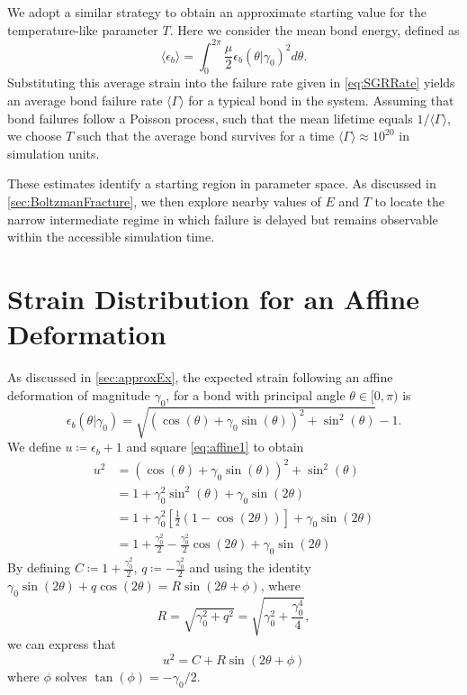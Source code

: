 \begin{subappendices}
We adopt a similar strategy to obtain an approximate starting value for the temperature-like parameter $T$. Here we consider the mean bond energy, defined as
\begin{equation*}
    \langle \epsilon_b \rangle = \int_0^{2\pi} \frac{\mu}{2} \epsilon_b(\theta | \gamma_0)^2 d\theta.
\end{equation*}
Substituting this average strain into the failure rate given in \cref{eq:SGRRate} yields an average bond failure rate $\langle \Gamma \rangle$ for a typical bond in the system. Assuming that bond failures follow a Poisson process, such that the mean lifetime equals $1/\langle \Gamma \rangle$, we choose $T$ such that the average bond survives for a time $\langle \Gamma \rangle \approx 10^{20}$ in simulation units.

These estimates identify a starting region in parameter space. As discussed in \cref{sec:BoltzmanFracture}, we then explore nearby values of $E$ and $T$ to locate the narrow intermediate regime in which failure is delayed but remains observable within the accessible simulation time.

\section{Strain Distribution for an Affine Deformation} \label{sec:affineStrainDist}
As discussed in \cref{sec:approxEx}, the expected strain following an affine deformation of magnitude $\gamma_0$, for a bond with principal angle $\theta\in[0,\pi)$ is
\begin{equation}
         \epsilon_b(\theta| \gamma_0) = \sqrt{(\cos(\theta) + \gamma_0\sin(\theta))^2 + \sin^2(\theta)} - 1. \label{eq:affine1}
\end{equation}
We define $u\coloneq\epsilon_b+1$ and square \cref{eq:affine1} to obtain
\begin{align*}
        u^2 
        &=(\cos(\theta) + \gamma_0\sin(\theta))^2 + \sin^2(\theta) \\
        &= 1+\gamma_0^2\sin^2(\theta) + \gamma_0\sin(2\theta) \\
        &= 1 + \gamma_0^2\left[\frac{1}{2}(1-\cos(2\theta))\right] + \gamma_0\sin(2\theta)\\
        &= 1+ \frac{\gamma_0^2}{2} - \frac{\gamma_0^2}{2}\cos(2\theta)+\gamma_0\sin(2\theta)
\end{align*}
By defining $C\coloneq1+ \frac{\gamma_0^2}{2}$, $q\coloneq- \frac{\gamma_0^2}{2}$ and using the identity $\gamma_0\sin(2\theta)+q\cos(2\theta)=R\sin(2\theta + \phi)$, where 
\begin{equation*}
    R=\sqrt{\gamma_0^2+q^2}=\sqrt{\gamma_0^2+\frac{\gamma_0^4}{4}},
\end{equation*}
we can express that
\begin{equation*}
    u^2=C+R\sin(2\theta+\phi)
\end{equation*}
where $\phi$ solves $\tan(\phi) = -\gamma_0/2$.


\end{subappendices}
